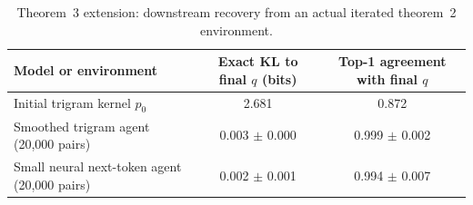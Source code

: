 \begin{table}[t]
\centering
\footnotesize
\caption{Theorem~3 extension: downstream recovery from an actual iterated theorem~2 environment.}
\label{tab:appx-theorem3-iterated-extension}
\begin{tabular}{lcc}
\toprule
Model or environment & Exact KL to final $q$ (bits) & Top-1 agreement with final $q$ \\
\midrule
Initial trigram kernel $p_0$ & 2.681 & 0.872 \\
Smoothed trigram agent (20,000 pairs) & 0.003 $\pm$ 0.000 & 0.999 $\pm$ 0.002 \\
Small neural next-token agent (20,000 pairs) & 0.002 $\pm$ 0.001 & 0.994 $\pm$ 0.007 \\
\bottomrule
\end{tabular}
\end{table}
